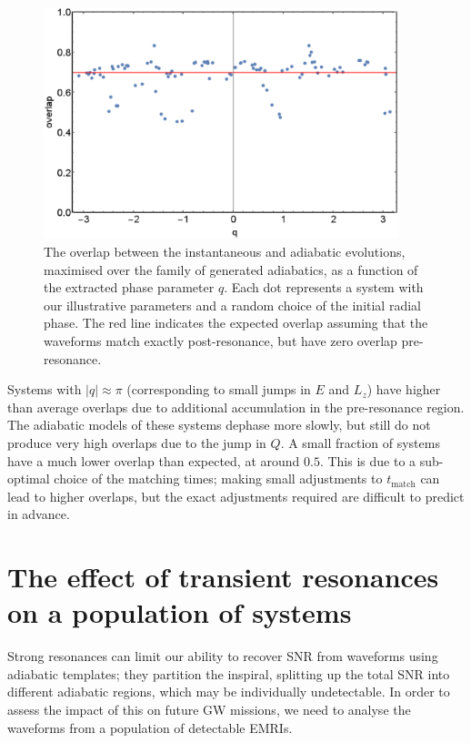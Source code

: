 \begin{figure}[htbp]
\centering
\includegraphics[width=0.92\textwidth]{overlap_vs_q}
\caption{\label{fig:overlap-vs-q}The overlap between the instantaneous and adiabatic evolutions, maximised over the family of generated adiabatics, as a function of the extracted phase parameter $q$. Each dot represents a system with our illustrative parameters and a random choice of the initial radial phase. The red line indicates the expected overlap assuming that the waveforms match exactly post-resonance, but have zero overlap pre-resonance.}
\end{figure}

Systems with $|q| \approx \pi$ (corresponding to small jumps in $E$ and $L_z$) have higher than average overlaps due to additional accumulation in the pre-resonance region. The adiabatic models of these systems dephase more slowly, but still do not produce very high overlaps due to the jump in $Q$. A small fraction of systems have a much lower overlap than expected, at around $0.5$. This is due to a sub-optimal choice of the matching times; making small adjustments to $t_\mathrm{match}$ can lead to higher overlaps, but the exact adjustments required are difficult to predict in advance.


\section{The effect of transient resonances on a population of systems}
\label{sec:effres-population}
Strong resonances can limit our ability to recover SNR from waveforms using adiabatic templates; they partition the inspiral, splitting up the total SNR into different adiabatic regions, which may be individually undetectable. In order to assess the impact of this on future GW missions, we need to analyse the waveforms from a population of detectable EMRIs.

